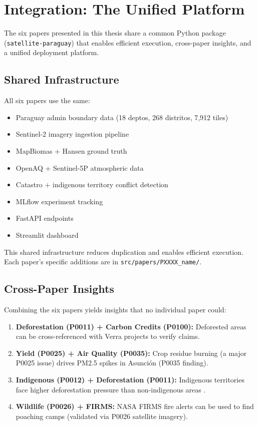 
\chapter{Integration: The Unified Platform}

The six papers presented in this thesis share a common Python package
(\texttt{satellite-paraguay}) that enables efficient execution, cross-paper
insights, and a unified deployment platform.

\section{Shared Infrastructure}

All six papers use the same:

\begin{itemize}
    \item Paraguay admin boundary data (18 deptos, 268 distritos, 7,912 tiles)
    \item Sentinel-2 imagery ingestion pipeline
    \item MapBiomas + Hansen ground truth
    \item OpenAQ + Sentinel-5P atmospheric data
    \item Catastro + indigenous territory conflict detection
    \item MLflow experiment tracking
    \item FastAPI endpoints
    \item Streamlit dashboard
\end{itemize}

This shared infrastructure reduces duplication and enables efficient execution.
Each paper's specific additions are in \texttt{src/papers/PXXXX\_name/}.

\section{Cross-Paper Insights}

Combining the six papers yields insights that no individual paper could:

\begin{enumerate}
    \item \textbf{Deforestation (P0011) + Carbon Credits (P0100):} Deforested
    areas can be cross-referenced with Verra projects to verify claims.
    \item \textbf{Yield (P0025) + Air Quality (P0035):} Crop residue burning
    (a major P0025 issue) drives PM2.5 spikes in Asunción (P0035 finding).
    \item \textbf{Indigenous (P0012) + Deforestation (P0011):} Indigenous
    territories face higher deforestation pressure than non-indigenous areas
    \citep{fao2024paraguay}.
    \item \textbf{Wildlife (P0026) + FIRMS:} NASA FIRMS fire alerts can be
    used to find poaching camps (validated via P0026 satellite imagery).
\end{enumerate}


